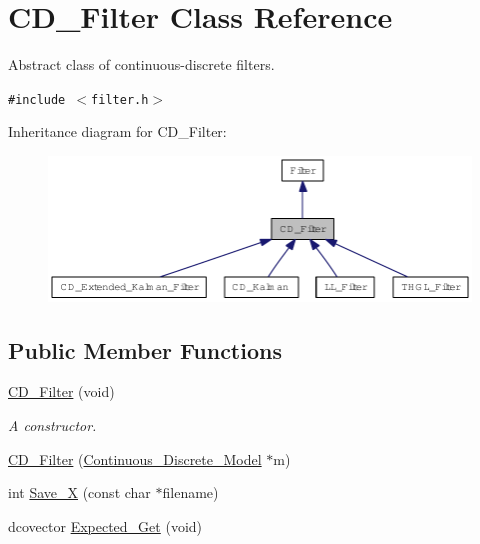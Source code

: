 \hypertarget{class_c_d___filter}{
\section{CD\_\-Filter Class Reference}
\label{class_c_d___filter}
}
Abstract class of continuous-discrete filters.  


{\tt \#include $<$filter.h$>$}

Inheritance diagram for CD\_\-Filter:\nopagebreak
\begin{figure}[H]
\begin{center}
\leavevmode
\includegraphics[width=400pt]{class_c_d___filter__inherit__graph}
\end{center}
\end{figure}
\subsection*{Public Member Functions}
\begin{CompactItemize}
\item 
\hyperlink{class_c_d___filter_b73ba4ee4ba0e1aaec09c8e88b8a4995}{CD\_\-Filter} (void)
\begin{CompactList}\small\item\em A constructor. \item\end{CompactList}\item 
\hyperlink{class_c_d___filter_b567ec6efd08a2f8bb33f3288c730346}{CD\_\-Filter} (\hyperlink{class_continuous___discrete___model}{Continuous\_\-Discrete\_\-Model} $\ast$m)
\item 
int \hyperlink{class_c_d___filter_b304de0cc156193c9e938188c1092188}{Save\_\-X} (const char $\ast$filename)
\item 
dcovector \hyperlink{class_c_d___filter_f5c2b82877e5cdad1e0cc782374809b0}{Expected\_\-Get} (void)
\end{CompactItemize}
